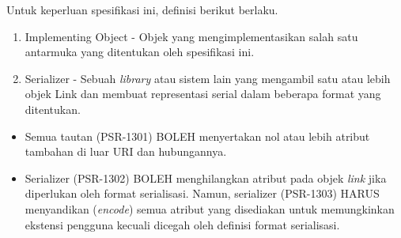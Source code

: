 \documentclass[a4paper,twoside]{article}
\begin{document}
\begin{enumerate}
\begin{enumerate}
\begin{itemize}
				Untuk keperluan spesifikasi ini, definisi berikut berlaku.
				\begin{enumerate}
					\item Implementing Object - Objek yang mengimplementasikan salah satu antarmuka yang ditentukan oleh spesifikasi ini.
					\item Serializer - Sebuah \textit{library} atau sistem lain yang mengambil satu atau lebih objek Link dan membuat representasi serial dalam beberapa format yang ditentukan.
				\end{enumerate}
				
				\begin{itemize}
					\item Semua tautan (PSR-1301) BOLEH menyertakan nol atau lebih atribut tambahan di luar URI dan hubungannya.
					\item Serializer (PSR-1302) BOLEH menghilangkan atribut pada objek \textit{link} jika diperlukan oleh format serialisasi. Namun, serializer (PSR-1303) HARUS menyandikan (\textit{encode}) semua atribut yang disediakan untuk memungkinkan ekstensi pengguna kecuali dicegah oleh definisi format serialisasi.
				\end{itemize}
				

\end{itemize}
\end{enumerate}
\end{enumerate}
\end{document}
